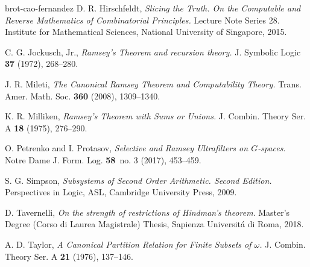 \documentclass[10pt,a4paper]{amsart}
\theoremstyle{definition}
\begin{document}
\begin{thebibliography}{brot-cao-fernandez}
D. R. Hirschfeldt,
{\em Slicing the Truth. On the Computable and Reverse Mathematics of Combinatorial Principles.}
Lecture Note Series 28.
Institute for Mathematical Sciences, National University of Singapore, 2015.

C. G. Jockusch, Jr.,
{\em Ramsey’s Theorem and recursion theory.}
J. Symbolic Logic
{\bf 37} (1972), 268--280.

J. R. Mileti,
{\em The Canonical Ramsey Theorem and Computability Theory.}
Trans. Amer. Math. Soc.
{\bf 360} (2008), 1309--1340.

K. R. Milliken,
{\em Ramsey's Theorem with Sums or Unions.}
J. Combin. Theory Ser. A
{\bf 18} (1975), 276--290.

O. Petrenko and I. Protasov,
{\it Selective and Ramsey Ultrafilters on $G$-spaces}.
Notre Dame J. Form. Log.
{\bf 58}~no. 3 (2017), 453--459.

S. G. Simpson,
{\em Subsystems of Second Order Arithmetic. Second Edition.}
Perspectives in Logic, ASL,
Cambridge University Press, 2009.

D. Tavernelli,
{\it On the strength of restrictions of Hindman's theorem}.
Master's Degree (Corso di Laurea Magistrale) Thesis,
Sapienza Universit\'a di Roma, 2018.

A. D. Taylor,
{\em A Canonical Partition Relation for Finite Subsets of $\omega$.}
J. Combin. Theory Ser. A
{\bf 21} (1976), 137--146.

\end{thebibliography}
\end{document}

